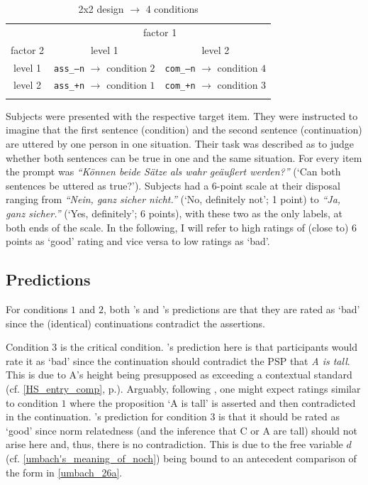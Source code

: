 \documentclass[output=paper,
modfonts
]{langscibook}
\begin{document}
\begin{table}
\begin{tabular}{ccc}
\lsptoprule                     
         & \multicolumn{2}{c}{factor 1}\\\cmidrule(lr){2-3}
factor 2 & level 1 & level 2 \\
\midrule
level 1 & \texttt{ass\_--n} $\rightarrow$ condition $2$ & \texttt{com\_--n} $\rightarrow$ condition $4$ \\
level 2 & \texttt{ass\_+n} $\rightarrow$ condition $1$ & \texttt{com\_+n} $\rightarrow$ condition $3$ \\
\lspbottomrule
\end{tabular}
\caption{2x2 design $\rightarrow$ 4 conditions}
\label{tab:factors_levels_conds}
\end{table}

\noindent Subjects were presented with the respective target item. They were instructed to imagine that the first sentence (condition) and the second sentence (continuation) are uttered by one person in one situation. Their task was described as to judge whether both sentences can be true in one and the same situation. For every item the prompt was \textit{``Können beide Sätze als wahr geäußert werden?''} (`Can both sentences be uttered as true?'). Subjects had a 6-point scale at their disposal ranging from \textit{``Nein, ganz sicher nicht.''} (`No, definitely not'; 1 point) to \textit{``Ja, ganz sicher.''} (`Yes, definitely'; 6 points), with these two as the only labels, at both ends of the scale. In the following, I will refer to high ratings of (close to) 6 points as `good' rating and vice versa to low ratings as `bad'.

\subsection{Predictions}
For conditions $1$ and $2$, both \citeauthor{Hofstetter2013}'s and \citeauthor{umbach2009a_comp}'s predictions are that they are rated as `bad' since the (identical) continuations contradict the assertions. 

Condition $3$ is the critical condition. \citeauthor{Hofstetter2013}'s prediction here is that participants would rate it as `bad' since the continuation should contradict the PSP that \textit{A is tall}. This is due to A's height being presupposed as exceeding a contextual standard (cf. \ref{HS_entry_comp}, p.\pageref{HS_entry_comp}). Arguably, following \citeauthor{Hofstetter2013}, one might expect ratings similar to condition $1$ where the proposition `A is tall' is asserted and then contradicted in the continuation. \citeauthor{umbach2009a_comp}'s prediction for condition $3$ is that it should be rated as `good' since norm relatedness (and the inference that C or A are tall) should not arise here and, thus, there is no contradiction. This is due to the free variable $d$ (cf. \ref{umbach's_meaning_of_noch}) being bound to an antecedent comparison of the form in \ref{umbach_26a}.
\end{document}

